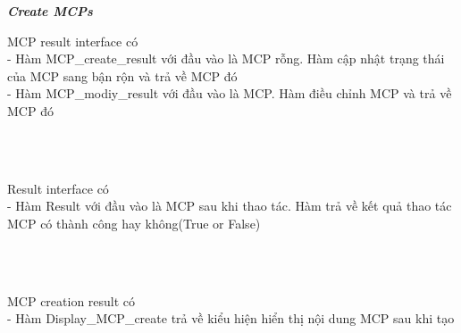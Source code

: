 \documentclass[a4paper]{article}
\begin{document}
\begin{itemize}
\newline
\newline
\textbf{    \textit{Create MCPs} } \\
\begin{minipage}[b]{0.4\textwidth}
 MCP result interface có \\
- Hàm MCP\_create\_result với đầu vào là MCP rỗng. Hàm cập nhật trạng thái của MCP sang bận rộn và trả về MCP đó  \\
-  Hàm MCP\_modiy\_result với đầu vào là MCP. Hàm  điều chỉnh MCP và trả về MCP đó
\end{minipage}
\hfill
{}
\\ \\
\begin{minipage}[b]{0.4\textwidth}
  Result interface có \\
- Hàm Result với đầu vào là MCP sau khi thao tác. Hàm trả về kết quả thao tác MCP có thành công hay không(True or False)
\end{minipage}
\hfill
{}
\\ \\
\begin{minipage}[b]{0.4\textwidth}
  MCP creation result có \\
- Hàm Display\_MCP\_create trả về  kiểu hiện hiển thị nội dung MCP sau khi tạo
\end{minipage}
\hfill
{}

\end{itemize}
\end{document}
